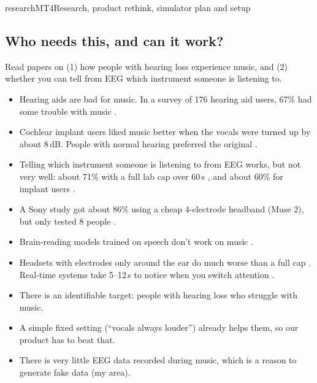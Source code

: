 \begin{entry}{research}{MT4}{Research, product rethink, simulator plan and setup}

\subsection*{Who needs this, and can it work?}
Read papers on (1) how people with hearing loss experience music, and (2) whether you can tell from EEG which instrument someone is listening to.
\begin{itemize}
  \item Hearing aids are bad for music. In a survey of 176 hearing aid users, 67\% had some trouble with music \cite{Greasley2020}.
  \item Cochlear implant users liked music better when the vocals were turned up by about 8\,dB. People with normal hearing preferred the original \cite{Tahmasebi2020}.
  \item Telling which instrument someone is listening to from EEG works, but not very well: about 71\% with a full lab cap over 60\,s \cite{Simon2023}, and about 60\% for implant users \cite{Althoff2026}.
  \item A Sony study got about 86\% using a cheap 4-electrode headband (Muse 2), but only tested 8 people \cite{Akama2026}.
  \item Brain-reading models trained on speech don't work on music \cite{Simon2023}.
  \item Headsets with electrodes only around the ear do much worse than a full cap \cite{Zhu2024}. Real-time systems take 5--12\,s to notice when you switch attention \cite{COCOHA2024}.
\end{itemize}
\begin{itemize}
  \item There is an identifiable target: people with hearing loss who struggle with music.
  \item A simple fixed setting (``vocals always louder'') already helps them, so our product has to beat that.
  \item There is very little EEG data recorded during music, which is a reason to generate fake data (my area).
\end{itemize}


\end{entry}
